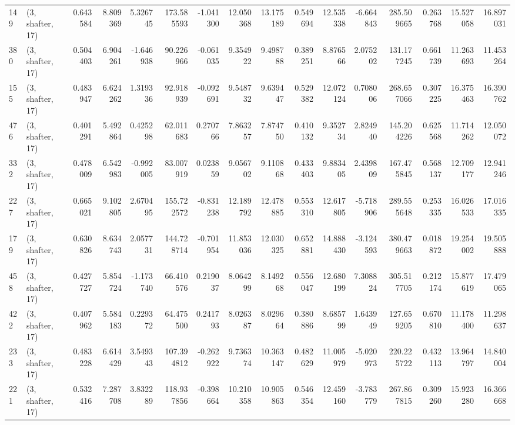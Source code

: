 \begin{tabular}{llrrrrrrrrrrrrrr}
149 &  (3, shafter, 17) &   0.643584 &   8.809369 &   5.326745 &   173.585593 &  -1.041300 &  12.050368 &  13.175189 &  0.549694 &  12.535338 &  -6.664843 &    285.509665 &    0.263768 &   15.527058 &   16.897031 \\
380 &  (3, shafter, 17) &   0.504403 &   6.904261 &  -1.646938 &    90.226966 &  -0.061035 &   9.354922 &   9.498788 &  0.389251 &   8.876566 &   2.075202 &    131.177245 &    0.661739 &   11.263693 &   11.453264 \\
155 &  (3, shafter, 17) &   0.483947 &   6.624262 &   1.319336 &    92.918939 &  -0.092691 &   9.548732 &   9.639447 &  0.529382 &  12.072124 &   0.708006 &    268.657066 &    0.307225 &   16.375463 &   16.390762 \\
476 &  (3, shafter, 17) &   0.401291 &   5.492864 &   0.425298 &    62.011683 &   0.270766 &   7.863257 &   7.874750 &  0.410132 &   9.352734 &   2.824940 &    145.204226 &    0.625568 &   11.714262 &   12.050072 \\
332 &  (3, shafter, 17) &   0.478009 &   6.542983 &  -0.992005 &    83.007919 &   0.023859 &   9.056702 &   9.110868 &  0.433403 &   9.883405 &   2.439809 &    167.475845 &    0.568137 &   12.709177 &   12.941246 \\
227 &  (3, shafter, 17) &   0.665021 &   9.102805 &   2.670495 &   155.722572 &  -0.831238 &  12.189792 &  12.478885 &  0.553310 &  12.617805 &  -5.718906 &    289.555648 &    0.253335 &   16.026533 &   17.016335 \\
179 &  (3, shafter, 17) &   0.630826 &   8.634743 &   2.057731 &   144.728714 &  -0.701954 &  11.853036 &  12.030325 &  0.652881 &  14.888430 &  -3.124593 &    380.479663 &    0.018872 &   19.254002 &   19.505888 \\
458 &  (3, shafter, 17) &   0.427727 &   5.854724 &  -1.173740 &    66.410576 &   0.219037 &   8.064299 &   8.149268 &  0.556047 &  12.680199 &   7.308824 &    305.517705 &    0.212174 &   15.877619 &   17.479065 \\
422 &  (3, shafter, 17) &   0.407962 &   5.584183 &   0.229372 &    64.475500 &   0.241793 &   8.026387 &   8.029664 &  0.380886 &   8.685799 &   1.643949 &    127.659205 &    0.670810 &   11.178400 &   11.298637 \\
233 &  (3, shafter, 17) &   0.483228 &   6.614429 &   3.549343 &   107.394812 &  -0.262922 &   9.736374 &  10.363147 &  0.482629 &  11.005979 &  -5.020973 &    220.225722 &    0.432113 &   13.964797 &   14.840004 \\
221 &  (3, shafter, 17) &   0.532416 &   7.287708 &   3.832289 &   118.937856 &  -0.398664 &  10.210358 &  10.905863 &  0.546354 &  12.459160 &  -3.783779 &    267.867815 &    0.309260 &   15.923280 &   16.366668 \\

\end{tabular}
